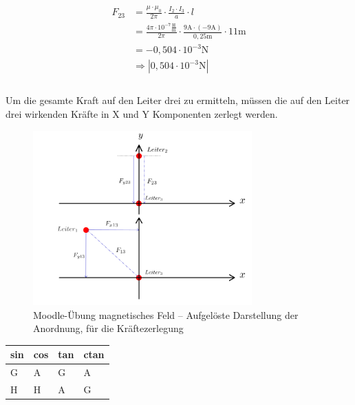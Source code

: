 \begin{enumerate}
        \begin{align*}
          F_{23} & =\frac{\mu\cdot\mu_{0}}{2\pi}\cdot\frac{I_{2}\cdot I_{3}}{a}\cdot l                                                           \\
                 & =\frac{4\pi\cdot 10^{-7}\frac{\text{H}}{\text{m}}}{2\pi}\cdot\frac{9\text{A}\cdot (-9\text{A})}{0,25\text{m}}\cdot 11\text{m} \\
                 & = -0,504\cdot 10^{-3}\text{N}                                                                                                 \\
                 & \Rightarrow |0,504\cdot 10^{-3}\text{N}|                                                                                      \\                                                                                                                                                                 \\
        \end{align*}

        Um die gesamte Kraft auf den Leiter drei zu ermitteln, müssen die auf den Leiter drei wirkenden Kräfte in X und Y Komponenten zerlegt werden.

        \begin{figure}[h!]
          \begin{center}
            \includegraphics[width=0.75\textwidth]{img/Magnetisches-Feld/A2.2.1.png}
          \end{center}
          \caption{Moodle-Übung magnetisches Feld – Aufgelöste Darstellung der Anordnung, für die Kräftezerlegung}
        \end{figure}

        \begin{table}[h!]
          \centering
          \begin{tabular}{llll}
            \hline
            sin & cos & tan & ctan \\ \hline
            G   & A   & G   & A    \\
            H   & H   & A   & G    \\ \hline
          \end{tabular}
        \end{table}



\end{enumerate}
